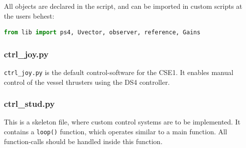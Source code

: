 All objects are declared in the script, and can be imported in custom scripts at the users behest: 
    \begin{lstlisting}[language=python,basicstyle=\mlttfamily, breaklines=true]
    from lib import ps4, Uvector, observer, reference, Gains
    \end{lstlisting}
    
\subsubsection{ctrl\_joy.py}

\lstinline{ctrl_joy.py} is the default control-software for the CSE1. It enables manual control of the vessel thrusters  using the DS4 controller.












\subsubsection{ctrl\_stud.py}

This is a skeleton file, where custom control systems are to be implemented. It contains a \lstinline{loop()} function, which operates similar to a main function. All function-calls should be handled inside this function.


